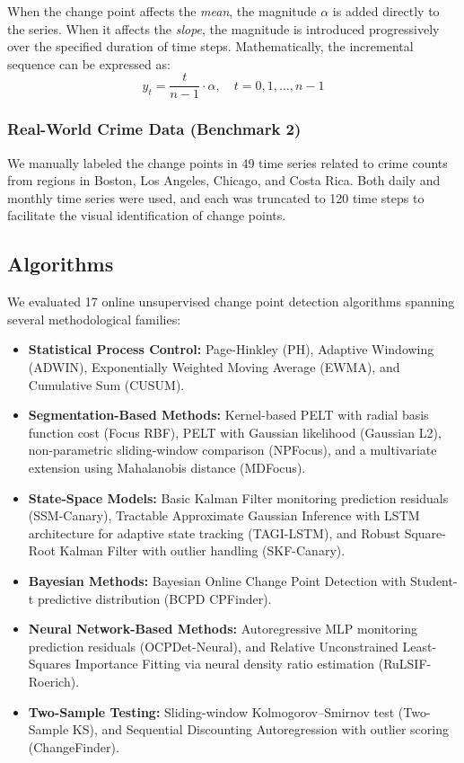 \documentclass[journal,article,submit,pdftex,moreauthors]{Definitions/mdpi}
\begin{document}
When the change point affects the \textit{mean}, the magnitude $\alpha$ is added directly to the series.  
When it affects the \textit{slope}, the magnitude is introduced progressively over the specified duration of time steps.  
Mathematically, the incremental sequence can be expressed as:
\begin{equation}
    y_t = \frac{t}{n - 1} \cdot \alpha, \quad t = 0, 1, \ldots, n - 1
\end{equation}

\subsubsection{Real-World Crime Data (Benchmark 2)}
We manually labeled the change points in 49 time series related to crime counts from regions in Boston, Los Angeles, Chicago, and Costa Rica.  
Both daily and monthly time series were used, and each was truncated to 120 time steps to facilitate the visual identification of change points.
\subsection{Algorithms}
We evaluated 17 online unsupervised change point detection algorithms spanning several methodological families:

\begin{itemize}
    \item \textbf{Statistical Process Control:} Page-Hinkley (PH), Adaptive Windowing (ADWIN), Exponentially Weighted Moving Average (EWMA), and Cumulative Sum (CUSUM).
    \item \textbf{Segmentation-Based Methods:} Kernel-based PELT with radial basis function cost (Focus RBF), PELT with Gaussian likelihood (Gaussian L2), non-parametric sliding-window comparison (NPFocus), and a multivariate extension using Mahalanobis distance (MDFocus).
    \item \textbf{State-Space Models:} Basic Kalman Filter monitoring prediction residuals (SSM-Canary), Tractable Approximate Gaussian Inference with LSTM architecture for adaptive state tracking (TAGI-LSTM), and Robust Square-Root Kalman Filter with outlier handling (SKF-Canary).
    \item \textbf{Bayesian Methods:} Bayesian Online Change Point Detection with Student-t predictive distribution (BCPD CPFinder).
    \item \textbf{Neural Network-Based Methods:} Autoregressive MLP monitoring prediction residuals (OCPDet-Neural), and Relative Unconstrained Least-Squares Importance Fitting via neural density ratio estimation (RuLSIF-Roerich).
    \item \textbf{Two-Sample Testing:} Sliding-window Kolmogorov--Smirnov test (Two-Sample KS), and Sequential Discounting Autoregression with outlier scoring (ChangeFinder).
\end{itemize}
\end{document}
